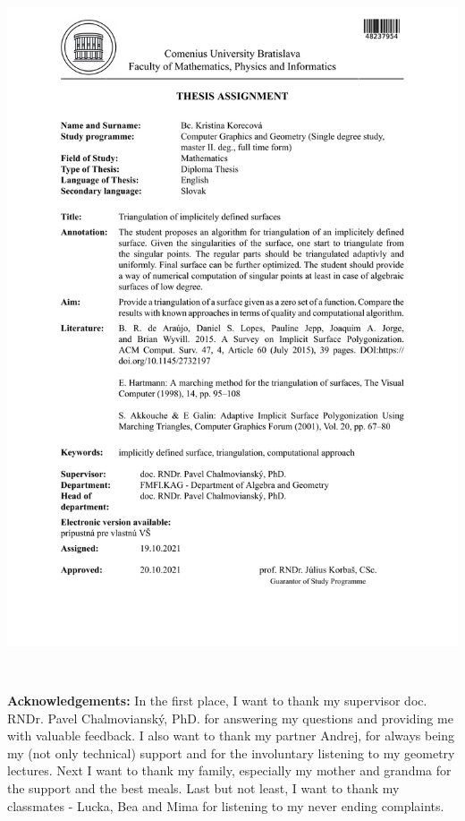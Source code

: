 \documentclass[12pt, twoside]{book}
\begin{document}
\hspace{-2cm}\includegraphics[page=2,width=1.1\textwidth]{images/zadanie-en}


\frontmatter

\setcounter{page}{3}
\newpage 
~

\vfill
{\bf Acknowledgements:} In the first place, I want to thank my supervisor doc.
RNDr. Pavel Chalmovianský, PhD. for answering my questions and providing me 
with valuable feedback.
I also want to thank my partner Andrej, for always being my (not only technical)
support and for the involuntary listening to my geometry lectures. Next I want to 
thank my family, especially my mother and grandma for the support and the best meals.
Last but not least, I want to thank my classmates - Lucka, Bea and Mima for listening
to my never ending complaints.
\end{document}
